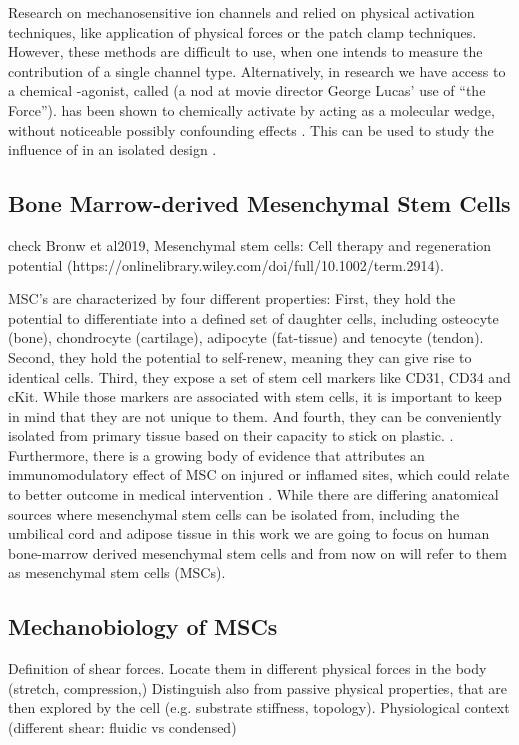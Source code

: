 Research on mechanosensitive ion channels and \Piezo{} relied on physical activation techniques, like application of physical forces or the patch clamp techniques. However, these methods are difficult to use, when one intends to measure the contribution of a single channel type. \cite{Dubin2017} Alternatively, in research we have access to a chemical \Piezo{}-agonist, called \Yoda{} (a nod at movie director George Lucas’ use of “the Force”). \Yoda{} has been shown to chemically activate \Piezo{} by acting as a molecular wedge, without noticeable possibly confounding effects \cite{Syeda2015, Lacroix2018}. This can be used to study the influence of \Piezo{} in an isolated design \cite{Botello-Smith2019}.

\subsection{Bone Marrow-derived Mesenchymal Stem Cells}

check Bronw et al2019, Mesenchymal stem cells: Cell therapy and regeneration potential (https://onlinelibrary.wiley.com/doi/full/10.1002/term.2914). 

MSC's are characterized by four different properties: First, they hold the potential to differentiate into a defined set of daughter cells, including osteocyte (bone), chondrocyte (cartilage), adipocyte (fat-tissue) and tenocyte (tendon).\cite{Ng2008} Second, they hold the potential to self-renew, meaning they can give rise to identical cells. Third, they expose a set of stem cell markers like CD31, CD34 and cKit. While those markers are associated with stem cells, it is important to keep in mind that they are not unique to them. \cite{Battula2009} And fourth, they can be conveniently isolated from primary tissue based on their capacity to stick on plastic. \cite{Buhring2007}. Furthermore, there is a growing body of evidence that attributes an immunomodulatory effect of MSC on injured or inflamed sites, which could relate to better outcome in medical intervention \cite{Hass2011, Caplan2011}.
While there are differing anatomical sources where mesenchymal stem cells can be isolated from, including the umbilical cord and adipose tissue \cite{Barlow2008, Hass2011} in this work we are going to focus on human bone-marrow derived mesenchymal stem cells and from now on will refer to them as mesenchymal stem cells (MSCs).

\subsection{Mechanobiology of MSCs}
Definition of shear forces. Locate them in different physical forces in the body (stretch, compression,) Distinguish also from passive physical properties, that are then explored by the cell (e.g. substrate stiffness, topology).
Physiological context (different shear: fluidic vs condensed)


